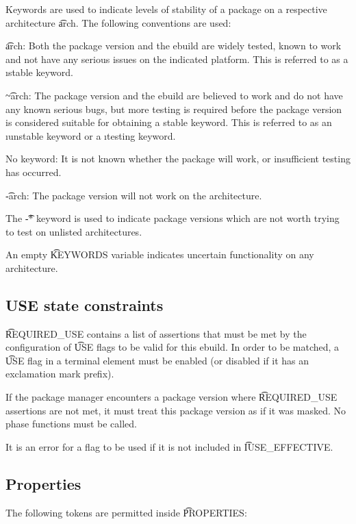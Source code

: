 Keywords are used to indicate levels of stability of a package on a respective architecture
\t{arch}. The following conventions are used:
\begin{compactitem}
\item \t{arch}: Both the package version and the ebuild are widely tested, known to work and not
    have any serious issues on the indicated platform. This is referred to as a \i{stable keyword}.
\item \t{\textasciitilde arch}: The package version and the ebuild are believed to work and do
    not have any known serious bugs, but more testing is required before the package version is
    considered suitable for obtaining a stable keyword. This is referred to as an \i{unstable
    keyword} or a \i{testing keyword}.
\item No keyword: It is not known whether the package will work, or insufficient testing has
    occurred.
\item \t{-arch}: The package version will not work on the architecture.
\end{compactitem}
The \t{-*} keyword is used to indicate package versions which are not worth trying to test on
unlisted architectures.

An empty \t{KEYWORDS} variable indicates uncertain functionality on any architecture.

\subsection{USE state constraints}
\label{sec:required-use}

\t{REQUIRED_USE} contains a list of assertions that must be met by the configuration of \t{USE}
flags to be valid for this ebuild. In order to be matched, a \t{USE} flag in a terminal element
must be enabled (or disabled if it has an exclamation mark prefix).

If the package manager encounters a package version where \t{REQUIRED_USE} assertions are not met,
it must treat this package version as if it was masked. No phase functions must be called.

It is an error for a flag to be used if it is not included in \t{IUSE_EFFECTIVE}.

\subsection{Properties}
\label{sec:properties}

The following tokens are permitted inside \t{PROPERTIES}:

